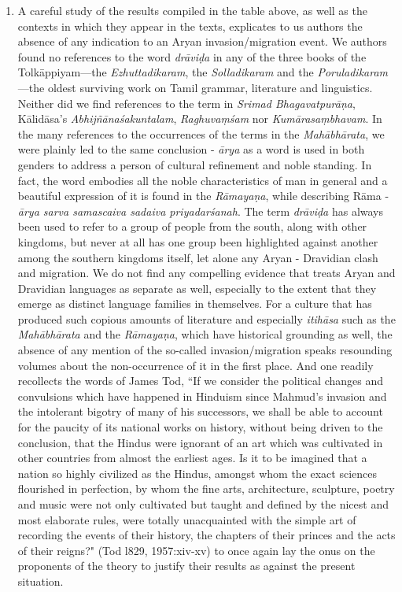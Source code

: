 \begin{enumerate}
\item A careful study of the results compiled in the table above, as well as the contexts in which they appear in the texts, explicates to us authors the absence of any indication to an Aryan invasion/migration event. We authors found no references to the word \textit{drāviḍa} in any of the three books of the Tolkāppiyam—the \textit{Ezhuttadikaram}, the \textit{Solladikaram} and the \textit{Poruladikaram}—the oldest surviving work on Tamil grammar, literature and linguistics. Neither did we find references to the term in \textit{Srimad Bhagavatpurāṇa}, Kālidāsa’s \textit{Abhijñānaśakuntalam}, \textit{Raghuvaṃśam} nor \textit{Kumārasaṃbhavam}. In the many references to the occurrences of the terms in the \textit{Mahābhārata}, we were plainly led to the same conclusion - \textit{ārya} as a word is used in both genders to address a person of cultural refinement and noble standing. In fact, the word embodies all the noble characteristics of man in general and a beautiful expression of it is found in the \textit{Rāmayaṇa}, while describing Rāma -\textit{ ārya sarva samascaiva sadaiva priyadarśanah}. The term \textit{drāviḍa} has always been used to refer to a group of people from the south, along with other kingdoms, but never at all has one group been highlighted against another among the southern kingdoms itself, let alone any Aryan - Dravidian clash and migration. We do not find any compelling evidence that treats Aryan and Dravidian languages as separate as well, especially to the extent that they emerge as distinct language families in themselves. For a culture that has produced such copious amounts of literature and especially \textit{itihāsa} such as the \textit{Mahābhārata} and the \textit{Rāmayaṇa}, which have historical grounding as well, the absence of any mention of the so-called invasion/migration speaks resounding volumes about the non-occurrence of it in the first place. And one readily recollects the words of James Tod, “If we consider the political changes and convulsions which have happened in Hinduism since Mahmud's invasion and the intolerant bigotry of many of his successors, we shall be able to account for the paucity of its national works on history, without being driven to the conclusion, that the Hindus were ignorant of an art which was cultivated in other countries from almost the earliest ages. Is it to be imagined that a nation so highly civilized as the Hindus, amongst whom the exact sciences flourished in perfection, by whom the fine arts, architecture, sculpture, poetry and music were not only cultivated but taught and defined by the nicest and most elaborate rules, were totally unacquainted with the simple art of recording the events of their history, the chapters of their princes and the acts of their reigns?" (Tod l829, 1957:xiv-xv) to once again lay the onus on the proponents of the theory to justify their results as against the present situation. 


\end{enumerate}
